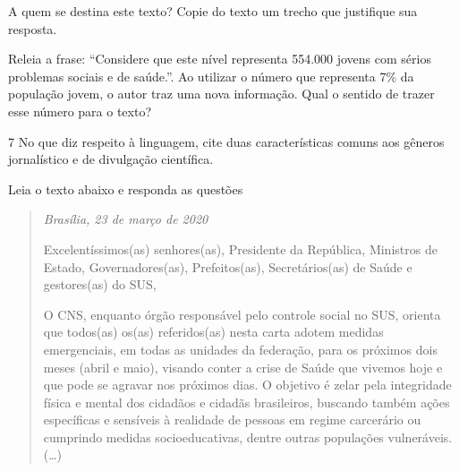 {\begin{quote}
\end{quote}


\begin{escolha}
  \item A quem se destina este texto? Copie do texto um trecho que justifique
  sua resposta.


  \item Releia a frase: ``Considere que este nível representa 554.000 jovens
  com sérios problemas sociais e de saúde.''. Ao utilizar o número que
  representa 7\% da população jovem, o autor traz uma nova informação.
  Qual o sentido de trazer esse número para o texto?


\end{escolha}

\num{7} No que diz respeito à linguagem, cite duas características comuns aos gêneros
jornalístico e de divulgação científica.


Leia o texto abaixo e responda as questões

\begin{quote}

\emph{Brasília, 23 de março de 2020}

Excelentíssimos(as) senhores(as), Presidente da República, Ministros de
Estado, Governadores(as), Prefeitos(as), Secretários(as) de Saúde e
gestores(as) do SUS,

O CNS, enquanto órgão responsável pelo controle social no SUS, orienta
que todos(as) os(as) referidos(as) nesta carta adotem medidas
emergenciais, em todas as unidades da federação, para os próximos dois
meses (abril e maio), visando conter a crise de Saúde que vivemos hoje e
que pode se agravar nos próximos dias. O objetivo é zelar pela
integridade física e mental dos cidadãos e cidadãs brasileiros, buscando
também ações específicas e sensíveis à realidade de pessoas em regime
carcerário ou cumprindo medidas socioeducativas, dentre outras
populações vulneráveis. (\ldots{})


\end{quote}}
